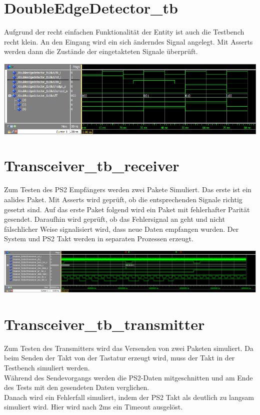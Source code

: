 \documentclass[a4paper,12pt]{report}
\begin{document}
	\section{DoubleEdgeDetector\_tb}
		Aufgrund der recht einfachen Funktionalität der Entity ist auch die Testbench recht klein. An den Eingang wird ein sich änderndes Signal angelegt. Mit Asserts werden dann die Zustände der eingetakteten Signale überprüft.
		\begin{center}
			\includegraphics[width=1\textwidth]{assets/DoubleEdgeDetector_tb}
		\end{center}
	
	\section{Transceiver\_tb\_receiver}
		Zum Testen des PS2 Empfängers werden zwei Pakete Simuliert. Das erste ist ein aalides Paket. Mit Asserts wird geprüft, ob die entsprechenden Signale richtig gesetzt sind. 
		Auf das erste Paket folgend wird ein Paket mit fehlerhafter Parität gesendet. Daraufhin wird geprüft, ob das Fehlersignal an geht und nicht fälschlicher Weise signalisiert wird, dass neue Daten empfangen wurden. 
		Der System und PS2 Takt werden in separaten Prozessen erzeugt.
		\begin{center}
			\includegraphics[width=1\textwidth]{assets/receiver_tb}
		\end{center}
	
		\pagebreak
	\section{Transceiver\_tb\_transmitter}
		Zum Testen des Transmitters wird das Versenden von zwei Paketen simuliert. Da beim Senden der Takt von der Tastatur erzeugt wird, muss der Takt in der Testbench simuliert werden.\\
		Während des Sendevorgangs werden die PS2-Daten mitgeschnitten und am Ende des Tests mit den gesendeten Daten verglichen.\\
		Danach wird ein Fehlerfall simuliert, indem der PS2 Takt als deutlich zu langsam simuliert wird. Hier wird nach 2ms ein Timeout ausgelöst.
		
\end{document}

